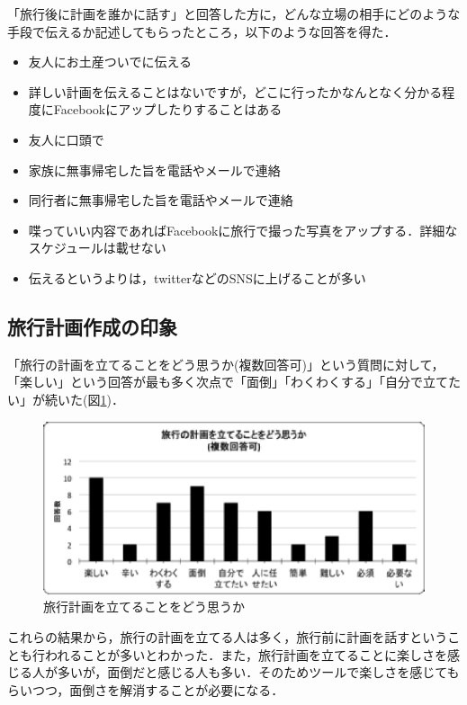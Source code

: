 \documentclass{funthesis}
\begin{document}
「旅行後に計画を誰かに話す」と回答した方に，どんな立場の相手にどのような手段で伝えるか記述してもらったところ，以下のような回答を得た．
\begin{itemize}
 \item 友人にお土産ついでに伝える
 \item 詳しい計画を伝えることはないですが，どこに行ったかなんとなく分かる程度にFacebookにアップしたりすることはある
 \item 友人に口頭で
 \item 家族に無事帰宅した旨を電話やメールで連絡
 \item 同行者に無事帰宅した旨を電話やメールで連絡
 \item 喋っていい内容であればFacebookに旅行で撮った写真をアップする．詳細なスケジュールは載せない
 \item 伝えるというよりは，twitterなどのSNSに上げることが多い
\end{itemize}



\subsection{旅行計画作成の印象}

「旅行の計画を立てることをどう思うか(複数回答可)」という質問に対して，「楽しい」という回答が最も多く次点で「面倒」「わくわくする」「自分で立てたい」が続いた(図\ref{Lhowthinktrip})．

\clearpage

\begin{figure}[htpb]
\begin{center}
\includegraphics[scale=0.7]{howthinktrip.eps}
\end{center}
\caption{旅行計画を立てることをどう思うか}
\label{Lhowthinktrip}
\end{figure}

これらの結果から，旅行の計画を立てる人は多く，旅行前に計画を話すということも行われることが多いとわかった．また，旅行計画を立てることに楽しさを感じる人が多いが，面倒だと感じる人も多い．そのためツールで楽しさを感じてもらいつつ，面倒さを解消することが必要になる．\\
\end{document}
